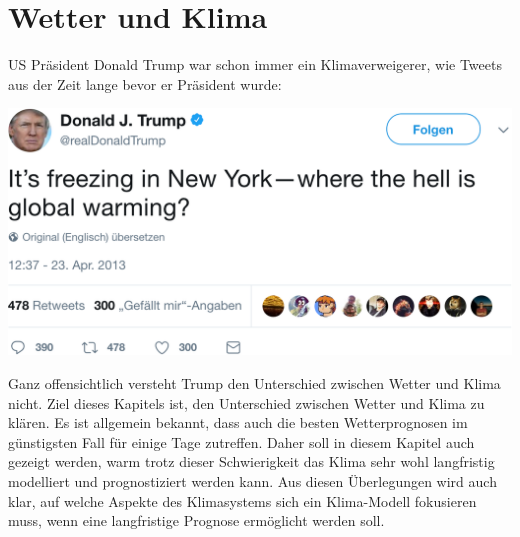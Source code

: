 %
%
%
%
\chapter{Wetter und Klima\label{chapter:wetter und klima}}
US Präsident Donald Trump war schon immer ein Klimaverweigerer, wie Tweets
aus der Zeit lange bevor er Präsident wurde:
\begin{center}
\includegraphics[width=\hsize]{chapters/1/trump.png}
\end{center}
Ganz offensichtlich versteht Trump den Unterschied zwischen Wetter und
Klima nicht.
Ziel dieses Kapitels ist, den Unterschied zwischen Wetter und Klima
zu klären.
Es ist allgemein bekannt, dass auch die besten Wetterprognosen im
günstigsten Fall für einige Tage zutreffen.
Daher soll in diesem Kapitel auch gezeigt werden, warm trotz dieser
Schwierigkeit das Klima sehr wohl langfristig modelliert und prognostiziert
werden kann.
Aus diesen Überlegungen wird auch klar, auf welche Aspekte des Klimasystems
sich ein Klima-Modell fokusieren muss, wenn eine langfristige Prognose
ermöglicht werden soll.






